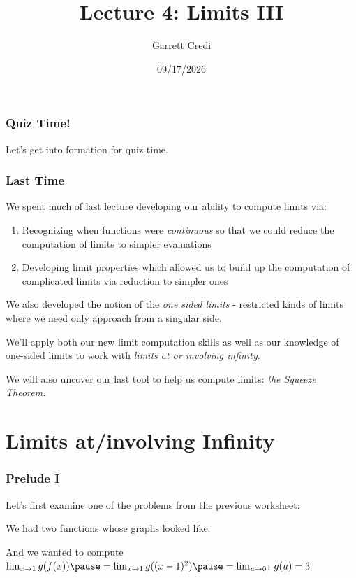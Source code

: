 \documentclass{ltx-talk}
\title{Lecture 4: Limits III}
\author{Garrett Credi}
\date{09/17/2026}
\begin{document}
\begin{frame}
  \maketitle
\end{frame}

\begin{frame}
  \frametitle{Quiz Time!}
  Let's get into formation for quiz time.
\end{frame}

\begin{frame}
  \frametitle{Last Time}

  We spent much of last lecture developing our ability to compute limits via: \pause

  \begin{enumerate}
    \item Recognizing when functions were \textit{continuous} so that we could reduce the computation of limits to simpler evaluations \pause
    \item Developing limit properties which allowed us to build up the computation of complicated limits via reduction to simpler ones 
  \end{enumerate}

  We also developed the notion of the \textit{one sided limits} - restricted kinds of limits where we need only approach from a singular side.
\end{frame}

\begin{frame}

  We'll apply both our new limit computation skills as well as our knowledge of one-sided limits to work with \textit{limits at or involving infinity}.

  We will also uncover our last tool to help us compute limits: \textit{the Squeeze Theorem.}
\end{frame}

\section{Limits at/involving Infinity}

\begin{frame}
  \frametitle{Prelude I}

  Let's first examine one of the problems from the previous worksheet: \pause

  We had two functions whose graphs looked like: \pause
  \vspace{2in}

  And we wanted to compute $\lim_{x \rightarrow 1} g(f(x)) \pause = \lim_{x \rightarrow 1} g((x-1)^2) \pause = \lim_{u \rightarrow 0^+} g(u) = 3$
\end{frame}
\end{document}
